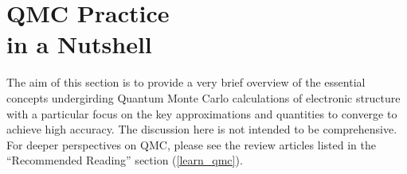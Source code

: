 \documentclass[oneside,11pt]{memoir}
\numberwithin{equation}{section}
\newcommand{\bu}[1]{\textbf{\underline{#1}}}
\begin{document}



\pagebreak
\chapter{QMC Practice \\in a Nutshell}\label{theory}
The aim of this section is to provide a very brief overview of the 
essential concepts undergirding Quantum Monte Carlo calculations 
of electronic structure with a particular focus on the key 
approximations and quantities to converge to achieve high
accuracy.  The discussion here is not intended to be comprehensive. 
For deeper perspectives on QMC, please see the review articles 
listed in the ``Recommended Reading'' section (\ref{learn_qmc}).
\end{document}
